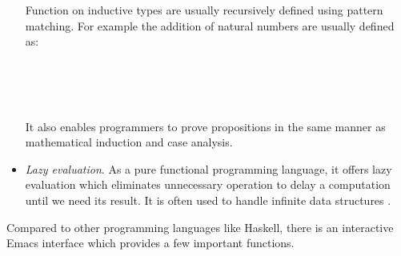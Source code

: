 \begin{itemize}
Function on inductive types are usually recursively defined using pattern matching. For example the addition of natural numbers are usually defined as:

\begin{code}\>\<%
\\
\>\AgdaFunction{\_+\_} \AgdaSymbol{:}     \<%
\\
\> \<[6]%
\>[6]\AgdaFunction{+}  \AgdaSymbol{=} \<%
\\
\>  \AgdaFunction{+}  \AgdaSymbol{=}  \AgdaSymbol{(} \AgdaFunction{+} \AgdaSymbol{)}\<%
\>\<\end{code}

It also enables programmers to prove propositions in the same manner as mathematical induction and case analysis.

\item \textit{Lazy evaluation}\label{lazyeval}. As a pure functional programming language, it offers lazy evaluation which eliminates unnecessary operation to delay a computation until we need its result. It is often used to handle infinite data structures \cite{wiki:Lazy_evaluation}.

\end{itemize}

Compared to other programming languages like Haskell, there is an interactive Emacs interface which provides a few important functions.

